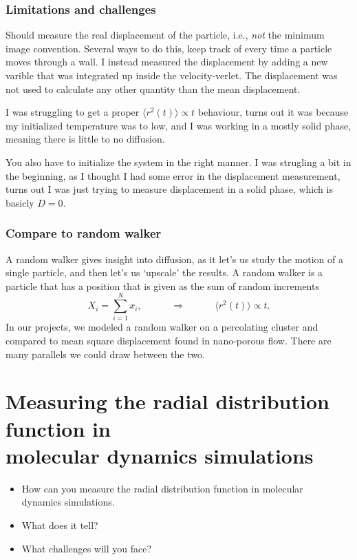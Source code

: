 \documentclass[a4paper, 11pt, notitlepage, english]{article}
\newcommand{\To}{\quad\Rightarrow\quad}
\begin{document}
\subsubsection*{Limitations and challenges}

Should measure the real displacement of the particle, i.e., \emph{not} the minimum image convention. Several ways to do this, keep track of every time a particle moves through a wall. I instead measured the displacement by adding a new varible that was integrated up inside the velocity-verlet. The displacement was not used to calculate any other quantity than the mean displacement.

I was struggling to get a proper $\langle r^2 (t) \rangle \propto t$ behaviour, turns out it was because my initialized temperature was to low, and I was working in a mostly solid phase, meaning there is little to no diffusion.

You also have to initialize the system in the right manner. I was strugling a bit in the beginning, as I thought I had some error in the displacement measurement, turns out I was just trying to measure displacement in a solid phase, which is basicly $D = 0$.

\subsubsection*{Compare to random walker}

A random walker gives insight into diffusion, as it let's us study the motion of a single particle, and then let's us `upscale' the results. A random walker is a particle that has a position that is given as the sum of random increments
$$X_i = \sum_{i=1}^N x_i, \qquad \To \qquad \langle r^2(t) \rangle \propto t.$$
In our projects, we modeled a random walker on a percolating cluster and compared to mean square displacement found in nano-porous flow. There are many parallels we could draw between the two.

\clearpage



\section{Measuring the radial distribution function in \\ molecular dynamics simulations}
\begin{itemize}
\item How can you measure the radial distribution function in molecular \\ dynamics
simulations.
\item What does it tell?
\item What challenges will you face?
\end{itemize}
\end{document}
